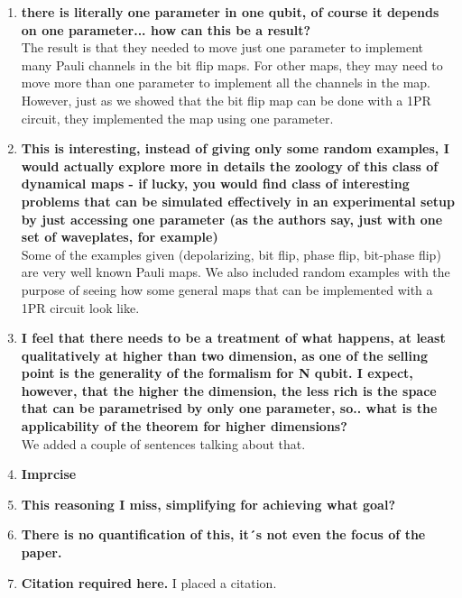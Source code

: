 \documentclass[10pt,letterpaper]{article} %
\begin{document}
\begin{enumerate}
\item \textbf{there is literally one parameter in one qubit, of course it depends on one parameter...
 how can this be a result?} \\
 
The result is that they needed  to move just one parameter to implement 
many Pauli channels in the bit flip maps.
For other maps, they may need to move more than one parameter to 
implement all the channels in the map. 
However, just as we showed that the bit flip map can be done with a 1PR circuit,
they implemented the map using one parameter.\\
  
 \item  \textbf{This is interesting, instead of giving only some random examples, I would actually explore more in details the zoology of this class of dynamical maps - if lucky, you would find class of interesting problems that can be simulated effectively in an experimental setup by just accessing one parameter (as the authors say, just with one set of waveplates, for example)} \\
 
Some of the examples given (depolarizing, bit flip, phase flip, bit-phase flip) are very well known 
Pauli maps.
We also included random examples with the purpose of seeing how some general maps that 
can be implemented with a 1PR circuit look like.
 
 \item  \textbf{I feel that there needs to be a treatment of what happens, at least qualitatively at higher than two dimension, as one of the selling point is the generality of the formalism for N qubit. I expect, however, that the higher the dimension, the less rich is the space that can be parametrised by only one parameter, so.. what is the applicability of the theorem for higher dimensions?} \\
 
 We added a couple of sentences talking about that.
  
 \item \textbf{Imprcise} \\ 
 
 
 
 \item \textbf{This reasoning I miss, simplifying for achieving what goal? }
  
 \item\textbf{ There is no quantification of this, it´s not even the focus of the paper.} 
 
 \item \textbf{Citation required here.}
 I placed a citation.
\end{enumerate}
\end{document}
